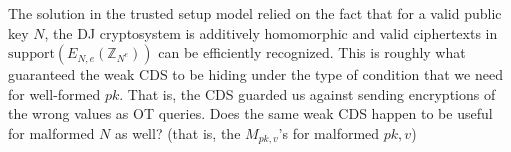 \documentclass[11pt]{article}
\newcommand{\encdj}{{E}_{N,e}}
\newcommand{\Z}{\mathbb{Z}}
\newcommand{\U}[1]{\mathbb{Z}_{#1}^*}
\newcommand{\plain}{{{M}}}
\newcommand{\encr}[2]{E_{#1}(#2)}
\newcommand{\plaintext}[1]{\plain_{#1}}
\newcommand{\fnrngdom}[2]{#1\to#2}
\newcommand{\fndef}[3]{{#1\,:\,\fnrngdom{#2}{#3}}}
\newcommand{\usamp}[2]{#1\stackrel{\footnotesize{\sf R}}{\leftarrow}#2}
\newcommand{\support}{{\mathrm{support}}}
\begin{document}
The solution in the trusted setup model relied on the fact that
for a valid public key $N$, the DJ cryptosystem is additively homomorphic and
valid ciphertexts in $\support(\encdj(\Z_{N^e}))$ can be
efficiently recognized. This is roughly what guaranteed the weak CDS to be hiding under the type of condition that we need for well-formed $pk$. That is, the CDS guarded us against sending encryptions of the wrong values as OT queries.
Does the same weak CDS happen to be useful for malformed $N$ as well?
(that is, the $M_{pk,v}$'s for malformed $pk,v$)
\end{document}

